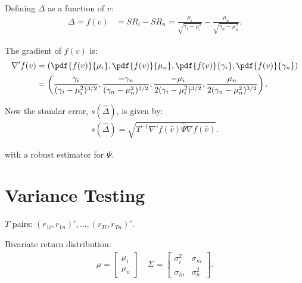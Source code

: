 \documentclass[12pt,oneside,a4paper]{article}
\begin{document}
Defining $\Delta$ as a function of $v$:
\begin{align}
\Delta = f(v) &= SR_{i} - SR_{n} = 
\frac{\mu_{i}}{\sqrt{\gamma_{i} - \mu^2_{i}}} - \frac{\mu_{n}}{\sqrt{\gamma_{n} - \mu^2_{n}}}.
\end{align}

The gradient of $f(v)$ is:
\begin{align*}
\nabla' f(v) &=
\left( 
\pdf{f(v)}{\mu_{i}},
\pdf{f(v)}{\mu_{n}},
\pdf{f(v)}{\gamma_{i}},
\pdf{f(v)}{\gamma_{n}}
\right)
\\ &=
\left( 
\frac{ \gamma_{i}}{(\gamma_{i} - \mu_{i}^2)^{3/2}},
\frac{-\gamma_{n}}{(\gamma_{n} - \mu_{n}^2)^{3/2}}, 
\frac{-\mu_{i}}{2(\gamma_{i} - \mu_{i}^2)^{3/2}},  
\frac{ \mu_{n}}{2(\gamma_{n} - \mu_{n}^2)^{3/2}}
\right).
\end{align*}

Now the standar error, $s(\hat{\Delta})$, is given by:
\begin{align*}
s(\hat{\Delta}) = \sqrt{T^{-1} \nabla'f(\hat{v}) \hat{\Psi} \nabla f(\hat{v})}.
\end{align*}

with a robust estimator for $\Psi$.
\clearpage \section{Variance Testing}
\cite{lw2011-var}

$T$ pairs: $(r_{1i}, r_{1n})', \dots, (r_{Ti}, r_{Tn})'$.


Bivariate return distribution:
\begin{align*}
\mu=
\begin{bmatrix}
\mu_{i} \\ \mu_{n}
\end{bmatrix}
\quad
\Sigma=
\begin{bmatrix}
\sigma_{i}^2 & \sigma_{ni}
\\
\sigma_{in} & \sigma_{n}^2
\end{bmatrix}.
\end{align*}
\end{document}
